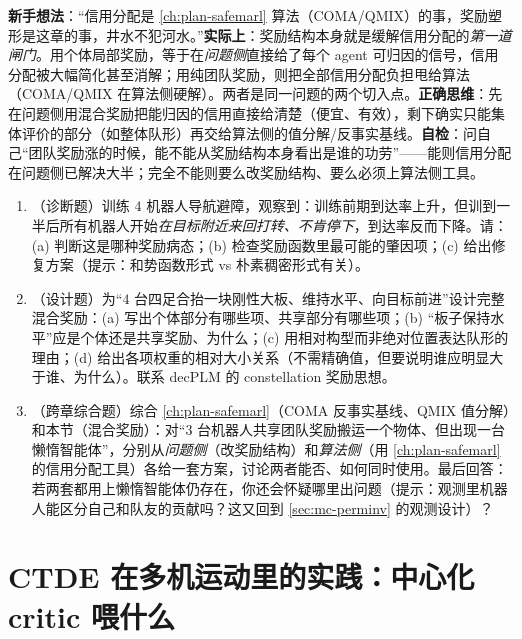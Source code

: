 \begin{pitfall}
\textbf{新手想法}：“信用分配是 \cref{ch:plan-safemarl} 算法（COMA/QMIX）的事，奖励塑形是这章的事，井水不犯河水。”\textbf{实际上}：奖励结构本身就是缓解信用分配的\emph{第一道闸门}。用个体局部奖励，等于在\emph{问题侧}直接给了每个 agent 可归因的信号，信用分配被大幅简化甚至消解；用纯团队奖励，则把全部信用分配负担甩给算法（COMA/QMIX 在算法侧硬解）。两者是同一问题的两个切入点。\textbf{正确思维}：先在问题侧用混合奖励把能归因的信用直接给清楚（便宜、有效），剩下确实只能集体评价的部分（如整体队形）再交给算法侧的值分解/反事实基线。\textbf{自检}：问自己“团队奖励涨的时候，能不能从奖励结构本身看出是谁的功劳”——能则信用分配在问题侧已解决大半；完全不能则要么改奖励结构、要么必须上算法侧工具。
\end{pitfall}

\begin{practice}
\begin{enumerate}
  \item （诊断题）训练 $4$ 机器人导航避障，观察到：训练前期到达率上升，但训到一半后所有机器人开始\emph{在目标附近来回打转、不肯停下}，到达率反而下降。请：(a) 判断这是哪种奖励病态；(b) 检查奖励函数里最可能的肇因项；(c) 给出修复方案（提示：和势函数形式 vs 朴素稠密形式有关）。
  \item （设计题）为“$4$ 台四足合抬一块刚性大板、维持水平、向目标前进”设计完整混合奖励：(a) 写出个体部分有哪些项、共享部分有哪些项；(b) “板子保持水平”应是个体还是共享奖励、为什么；(c) 用相对构型而非绝对位置表达队形的理由；(d) 给出各项权重的相对大小关系（不需精确值，但要说明谁应明显大于谁、为什么）。联系 decPLM 的 constellation 奖励思想。
  \item （跨章综合题）综合 \cref{ch:plan-safemarl}（COMA 反事实基线、QMIX 值分解）和本节（混合奖励）：对“$3$ 台机器人共享团队奖励搬运一个物体、但出现一台懒惰智能体”，分别从\emph{问题侧}（改奖励结构）和\emph{算法侧}（用 \cref{ch:plan-safemarl} 的信用分配工具）各给一套方案，讨论两者能否、如何同时使用。最后回答：若两套都用上懒惰智能体仍存在，你还会怀疑哪里出问题（提示：观测里机器人能区分自己和队友的贡献吗？这又回到 \cref{sec:mc-perminv} 的观测设计）？
\end{enumerate}
\end{practice}

\section{CTDE 在多机运动里的实践：中心化 critic 喂什么}
\label{sec:mc-ctde}

